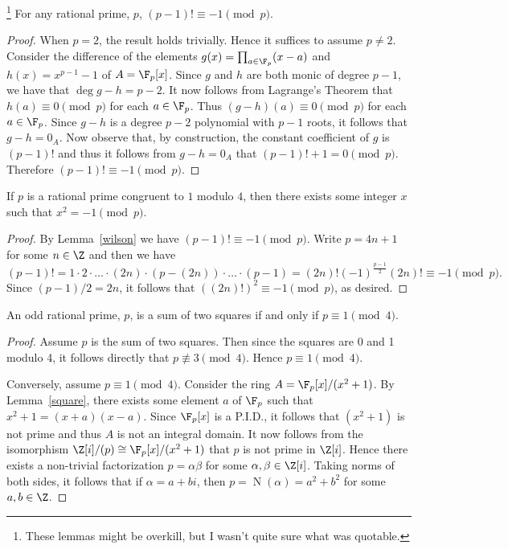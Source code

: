 \documentclass[10pt]{amsart}
\begin{document}
\begin{lem}\footnote{These lemmas might be overkill, but I wasn't quite sure what was quotable.}\label{wilson}
  For any rational prime, $p$, $(p-1)! \equiv -1 \pmod{p}$.
  \begin{proof}
    When $p = 2$, the result holds trivially.  
    Hence it suffices to assume $p \neq 2$.
    Consider the difference of the elements $g(x) = \prod_{a \in \F_p}(x - a)$ and $h(x) = x^{p-1} - 1$ of $A = \F_p[x]$.
    Since $g$ and $h$ are both monic of degree $p-1$, we have that $\deg{g - h} = p - 2$.
    It now follows from Lagrange's Theorem that $h(a) \equiv 0 \pmod{p}$ for each $a \in \F_p$.
    Thus $(g-h)(a) \equiv 0 \pmod{p}$ for each $a \in \F_p$.
    Since $g-h$ is a degree $p-2$ polynomial with $p-1$ roots, it follows that $g-h = 0_A$.
    Now observe that, by construction, the constant coefficient of $g$ is $(p-1)!$ and thus it follows from $g - h = 0_A$ that $(p-1)! + 1 = 0 \pmod{p}$.
    Therefore $(p-1)! \equiv -1 \pmod{p}$.
  \end{proof}
\end{lem}

\begin{lem}\label{square}
  If $p$ is a rational prime congruent to $1$ modulo $4$, then there exists some integer $x$ such that $x^2 = -1 \pmod{p}$.
\end{lem}
\begin{proof}
  By Lemma~\ref{wilson} we have $(p-1)! \equiv -1 \pmod{p}$.
  Write $p = 4n + 1$ for some $n \in \Z$ and then we have 
  $$(p-1)! = 1 \cdot 2 \cdot \ldots \cdot (2n) \cdot (p - (2n)) \cdot \ldots \cdot (p - 1) = (2n)!(-1)^{\frac{p-1}{2}}(2n)! \equiv -1 \pmod{p}.$$
  Since $(p-1)/2 = 2n$, it follows that $((2n)!)^2 \equiv -1 \pmod{p}$, as desired.
\end{proof}

\begin{lem}
  An odd rational prime, $p$, is a sum of two squares if and only if $p \equiv 1 \pmod{4}$.
  \begin{proof}
    Assume $p$ is the sum of two squares.
    Then since the squares are 0 and 1 modulo 4, it follows directly that $p \not \equiv 3 \pmod{4}$.
    Hence $p \equiv 1 \pmod{4}$.

    Conversely, assume $p \equiv 1 \pmod{4}$.
    Consider the ring $A = \F_p[x]/(x^2 + 1)$.
    By Lemma~\ref{square}, there  exists some element $a$ of $\F_p$ such that $x^2 + 1 = (x + a)(x - a)$.
    Since $\F_p[x]$ is a P.I.D., it follows that $(x^2 + 1)$ is not prime and thus $A$ is not an integral domain.
    It now follows from the isomorphism $\Z[i]/(p) \cong \F_p[x]/(x^2 + 1)$ that $p$ is not prime in $\Z[i]$.
    Hence there exists a non-trivial factorization $p = \alpha\beta$ for some $\alpha, \beta \in \Z[i]$.
    Taking norms of both sides, it follows that if $\alpha = a+bi$, then $p = \operatorname{N}(\alpha) = a^2 + b^2$ for some $a,b \in \Z$.
  \end{proof}
\end{lem}
\end{document}
